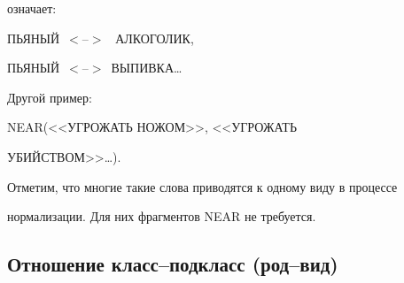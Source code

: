          \smallskip


         


\noindent


    означает: 


    


     \smallskip


     


         {\small


        \noindent


        ПЬЯНЫЙ~$<$--$>$~ АЛ\-КО\-ГО\-ЛИК,      


    ПЬЯНЫЙ~$<$--$>$~ВЫ\-ПИВ\-КА\ldots 


    }


    


         \smallskip


    


    Другой пример: 


    





     \smallskip


     


         {\small


    


        \noindent


        NEAR(<<УГРОЖАТЬ НОЖОМ>>, <<УГРОЖАТЬ 


УБИЙСТВОМ>>\ldots).


}





     \smallskip


    


 


    Отметим, что многие такие слова приводятся к одному виду в процессе 


нормализации. Для них фрагментов NEAR не требуется.


    


    \subsection{Отношение класс--подкласс (род--вид)}


